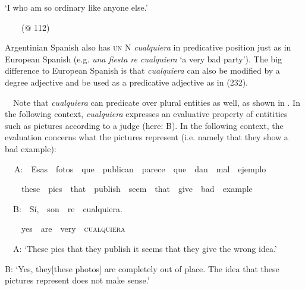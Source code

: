 \begin{styleStandard}
‘I who am so ordinary like anyone else.’
\end{styleStandard}

\begin{styleStandard}
\ \ \ \ (@ 112)
\end{styleStandard}

\begin{styleStandard}
Argentinian Spanish also has \textsc{un} N \textit{cualquiera} in predicative position just as in European Spanish (e.g. \textit{una fiesta re cualquiera} ‘a very bad party’). The big difference to European Spanish is that \textit{cualquiera} can also be modified by a degree adjective and be used as a predicative adjective as in (232).
\end{styleStandard}

\begin{styleStandard}
\ \ Note that \textit{cualquiera} can predicate over plural entities as well, as shown in . In the following context, \textit{cualquiera} expresses an evaluative property of entitities such as pictures according to a judge (here: B). In the following context, the evaluation concerns what the pictures represent (i.e. namely that they show a bad example):
\end{styleStandard}

\begin{styleStandard}
\label{bkm:Ref150786385}\textbf{\ \ }A:\ \ Esas\ \ fotos\ \ que\ \ publican\ \ parece\ \ que\ \ dan\ \ mal\ \ ejemplo
\end{styleStandard}

\begin{styleStandard}
\ \ \ \ these\ \ pics\ \ that\ \ publish\ \ seem\ \ that\ \ give\ \ bad\ \ example
\end{styleStandard}

\begin{styleStandard}
\ \ B:\ \ Sí,\ \ son\ \ re\ \ cualquiera.
\end{styleStandard}

\begin{styleStandard}
\ \ \ \ yes\ \ are\ \ very\ \ \textsc{cualquiera}
\end{styleStandard}

\begin{styleStandard}
\ \ A: ‘These pics that they publish it seems that they give the wrong idea.’
\end{styleStandard}

\begin{styleStandard}
B: ‘Yes, they[these photos] are completely out of place. The idea that these pictures represent does not make sense.’
\end{styleStandard}

